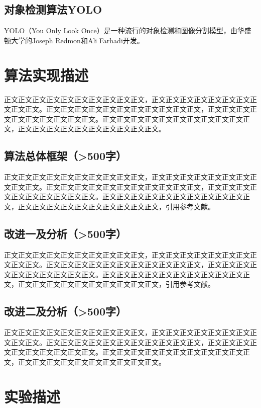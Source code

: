 \documentclass{article}
\begin{document}
\subsection{对象检测算法YOLO}
YOLO（You Only Look Once）是一种流行的对象检测和图像分割模型，由华盛顿大学的Joseph Redmon和Ali Farhadi开发。


\section{算法实现描述}
正文正文正文正文正文正文正文正文正文正文，正文正文正文正文正文正文正文正文正文正文。正文正文正文正文正文正文正文正文正文正文正文，正文正文正文正文正文正文正文正文正文正文。正文正文正文正文正文正文正文正文正文正文正文，正文正文正文正文正文正文正文正文正文正文。

\subsection{算法总体框架（>500字）}
正文正文正文正文正文正文正文正文正文正文，正文正文正文正文正文正文正文正文正文正文。正文正文正文正文正文正文正文正文正文正文正文，正文正文正文正文正文正文正文正文正文正文。正文正文正文正文正文正文正文正文正文正文正文，正文正文正文正文正文正文正文正文正文正文，引用参考文献\cite{HSV}。


\subsection{改进一及分析（>500字）}
正文正文正文正文正文正文正文正文正文正文，正文正文正文正文正文正文正文正文正文正文。正文正文正文正文正文正文正文正文正文正文正文，正文正文正文正文正文正文正文正文正文正文。正文正文正文正文正文正文正文正文正文正文正文，正文正文正文正文正文正文正文正文正文正文，引用参考文献\cite{ml}。

\subsection{改进二及分析（>500字）}
正文正文正文正文正文正文正文正文正文正文，正文正文正文正文正文正文正文正文正文正文。正文正文正文正文正文正文正文正文正文正文正文，正文正文正文正文正文正文正文正文正文正文。正文正文正文正文正文正文正文正文正文正文正文，正文正文正文正文正文正文正文正文正文正文\cite{imgaug}。


\section{实验描述}
\end{document}
